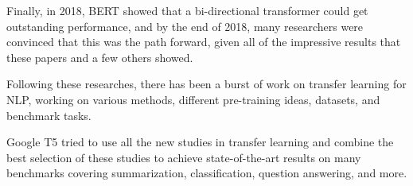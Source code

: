 Finally, in 2018, BERT \cite{devlin-etal-2019-bert} showed that a bi-directional transformer could get outstanding performance, and by the end of 2018, many researchers were convinced that this was the path forward, given all of the impressive results that these papers and a few others showed.

Following these researches, there has been a burst of work on transfer learning for NLP, working on various methods, different pre-training ideas, datasets, and benchmark tasks.

Google T5 \cite{raffel_exploring_2020} tried to use all the new studies in transfer learning and combine the best selection of these studies to achieve state-of-the-art results on many benchmarks covering summarization, classification, question answering, and more.
